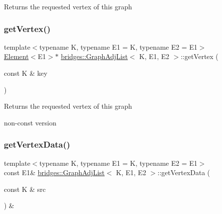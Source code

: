 \begin{DoxyReturn}{Returns}
the requested vertex of this graph 
\end{DoxyReturn}
\mbox{\label{classbridges_1_1_graph_adj_list_a8ba3aefe8e118ce8d8d6fab807e494c1}} 
\subsubsection{\texorpdfstring{get\+Vertex()}{getVertex()}\hspace{0.1cm}{\footnotesize\ttfamily [2/2]}}
{\footnotesize\ttfamily template$<$typename K, typename E1 = K, typename E2 = E1$>$ \\
\mbox{\hyperlink{classbridges_1_1_element}{Element}}$<$E1$>$$\ast$ \mbox{\hyperlink{classbridges_1_1_graph_adj_list}{bridges\+::\+Graph\+Adj\+List}}$<$ K, E1, E2 $>$\+::get\+Vertex (\begin{DoxyParamCaption}\item[{const K \&}]{key }\end{DoxyParamCaption})\hspace{0.3cm}{\ttfamily [inline]}}

\begin{DoxyReturn}{Returns}
the requested vertex of this graph
\end{DoxyReturn}
non-\/const version \mbox{\label{classbridges_1_1_graph_adj_list_a38ab30a0990187275d32e0590e150aaf}} 
\subsubsection{\texorpdfstring{get\+Vertex\+Data()}{getVertexData()}}
{\footnotesize\ttfamily template$<$typename K, typename E1 = K, typename E2 = E1$>$ \\
const E1\& \mbox{\hyperlink{classbridges_1_1_graph_adj_list}{bridges\+::\+Graph\+Adj\+List}}$<$ K, E1, E2 $>$\+::get\+Vertex\+Data (\begin{DoxyParamCaption}\item[{const K \&}]{src }\end{DoxyParamCaption}) \&\hspace{0.3cm}{\ttfamily [inline]}}

